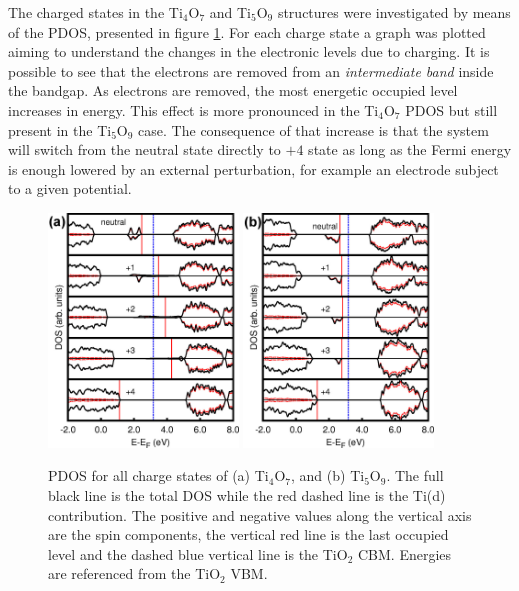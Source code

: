 The charged states in the Ti$_4$O$_7$ and Ti$_5$O$_9$ structures were investigated by means of the PDOS, presented in figure \ref{fig:pdos-charged}. For each charge state a graph was plotted aiming to understand the changes in the electronic levels due to charging. It is possible to see that the electrons are removed from an \textit{intermediate band} inside the bandgap. As electrons are removed, the most energetic occupied level increases in energy. This effect is more pronounced in the Ti$_4$O$_7$ PDOS but still present in the Ti$_5$O$_9$ case. The consequence of that increase is that the system will switch from the neutral state directly to $+4$ state as long as the Fermi energy is enough lowered by an external perturbation, for example an electrode subject to a given potential.
\begin{center}
 \begin{figure}[ht!]
  \begin{center}
   \includegraphics[width=0.45\textwidth]{img/dos-ti4o7-prl-ef.jpg}
   \includegraphics[width=0.45\textwidth]{img/dos-ti5o9-prl-ef.jpg}
   \caption{PDOS for all charge states of (a) Ti$_4$O$_7$, and (b) Ti$_5$O$_9$. The full black line is the total DOS while the red dashed line is the Ti(d) contribution. The positive and negative values along the vertical axis are the spin components, the vertical red line is the last occupied level and the dashed blue vertical line is the TiO$_2$ CBM. Energies are referenced from the TiO$_2$ VBM.}
   \label{fig:pdos-charged} 
  \end{center}
 \end{figure}
\end{center}

